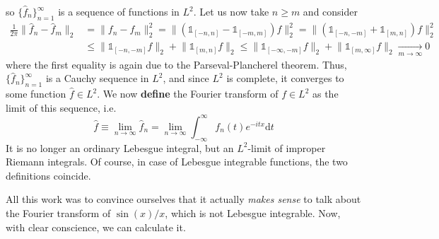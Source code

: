 so \(\{\hat{f}_n\}_{n=1}^{\infty }\) is a sequence of functions in \(L^2\). 
Let us now take \(n \geq m\) and consider
\begin{align*}
    \frac{1}{2\pi }\lVert \hat{f} _n - \hat{f} _m \rVert _2 &= \lVert f_n - f_m \rVert_2^2 = \lVert ( \mathbb{1}_{[-n,n]} - \mathbb{1}_{[-m,m]} ) f \rVert_2^2 
    = \lVert ( \mathbb{1}_{[-n,-m]} + \mathbb{1}_{[m,n]} ) f \rVert_2^2 \\
    &\leq \lVert \mathbb{1}_{[-n,-m]} f \rVert_2 + \lVert \mathbb{1}_{[m,n]} f \rVert_2
    \leq \lVert \mathbb{1}_{[-\infty ,-m]} f \rVert_2 + \lVert \mathbb{1}_{[m,\infty ]} f \rVert_2 \xrightarrow[m\to \infty ]{} 0
\end{align*}
where the first equality is again due to the Parseval-Plancherel theorem.
Thus, \(\{\hat{f} _n\}_{n=1}^{\infty}\) is a Cauchy sequence in \(L^2\), and since \(L^2\) is complete, it converges to some
function \(\hat{f} \in L^2\). We now \textbf{define} the Fourier transform of \(f\in L^2\) as the limit of this sequence,
i.e.
\begin{equation}
    \hat{f} \equiv  \lim_{n \to \infty} \hat{f} _n = \lim_{n \to \infty} \int_{-\infty}^{\infty} f_n(t) e^{-itx} \mathrm{d}t
\end{equation}  
It is no longer an ordinary Lebesgue integral, but an \(L^2\)-limit of improper Riemann integrals. Of course, in case
of Lebesgue integrable functions, the two definitions coincide. 

All this work was to convince ourselves that it actually \textit{makes sense} to talk about the Fourier transform of
\(\sin (x)/x\), which is not Lebesgue integrable. Now, with clear conscience, we can calculate it.
